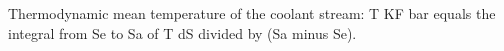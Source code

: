 Thermodynamic mean temperature of the coolant stream:  
T KF bar equals the integral from Se to Sa of T dS divided by (Sa minus Se).